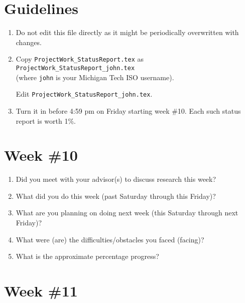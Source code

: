 \documentclass[letterpaper,12pt,fleqn]{article}
\begin{document}
\thispagestyle{empty}

\statustitle

\section*{Guidelines}

\begin{enumerate}
  \item Do not edit this file directly as it might be periodically
        overwritten with changes.
  \item Copy \texttt{ProjectWork\_StatusReport.tex} as 
        \texttt{ProjectWork\_StatusReport\_john.tex}\\
        (where \texttt{john} is your Michigan Tech ISO username).

        Edit  \texttt{ProjectWork\_StatusReport\_john.tex}.
  \item Turn it in before 4:59 pm on Friday starting week \#10. Each such
        status report is worth 1\%.
\end{enumerate}

\clearpage
\section*{Week \#10}

\begin{spacing}{1.50}
  \begin{enumerate}
    \item Did you meet with your advisor(s) to discuss research this week?
          \vfill

    \item What did you do this week (past Saturday through this Friday)? 
          \vfill

    \item What are you planning on doing next week (this Saturday through next Friday)? 
          \vfill

    \item What were (are) the difficulties/obstacles you faced (facing)?
          \vfill

    \item What is the approximate percentage progress?
          \vfill
  \end{enumerate}
\end{spacing}

\clearpage
\section*{Week \#11}
\end{document}
